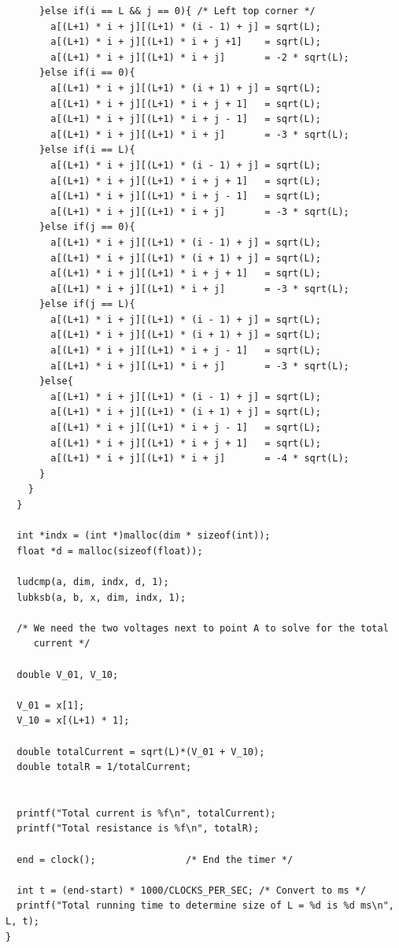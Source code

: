 \documentclass{article}
\begin{document}
\begin{verbatim}
      }else if(i == L && j == 0){ /* Left top corner */
        a[(L+1) * i + j][(L+1) * (i - 1) + j] = sqrt(L);
        a[(L+1) * i + j][(L+1) * i + j +1]    = sqrt(L);
        a[(L+1) * i + j][(L+1) * i + j]       = -2 * sqrt(L);
      }else if(i == 0){
        a[(L+1) * i + j][(L+1) * (i + 1) + j] = sqrt(L);
        a[(L+1) * i + j][(L+1) * i + j + 1]   = sqrt(L);
        a[(L+1) * i + j][(L+1) * i + j - 1]   = sqrt(L);
        a[(L+1) * i + j][(L+1) * i + j]       = -3 * sqrt(L);
      }else if(i == L){
        a[(L+1) * i + j][(L+1) * (i - 1) + j] = sqrt(L);
        a[(L+1) * i + j][(L+1) * i + j + 1]   = sqrt(L);
        a[(L+1) * i + j][(L+1) * i + j - 1]   = sqrt(L);
        a[(L+1) * i + j][(L+1) * i + j]       = -3 * sqrt(L);
      }else if(j == 0){
        a[(L+1) * i + j][(L+1) * (i - 1) + j] = sqrt(L);
        a[(L+1) * i + j][(L+1) * (i + 1) + j] = sqrt(L);
        a[(L+1) * i + j][(L+1) * i + j + 1]   = sqrt(L);
        a[(L+1) * i + j][(L+1) * i + j]       = -3 * sqrt(L);
      }else if(j == L){
        a[(L+1) * i + j][(L+1) * (i - 1) + j] = sqrt(L);
        a[(L+1) * i + j][(L+1) * (i + 1) + j] = sqrt(L);
        a[(L+1) * i + j][(L+1) * i + j - 1]   = sqrt(L);
        a[(L+1) * i + j][(L+1) * i + j]       = -3 * sqrt(L);
      }else{
        a[(L+1) * i + j][(L+1) * (i - 1) + j] = sqrt(L);
        a[(L+1) * i + j][(L+1) * (i + 1) + j] = sqrt(L);
        a[(L+1) * i + j][(L+1) * i + j - 1]   = sqrt(L);
        a[(L+1) * i + j][(L+1) * i + j + 1]   = sqrt(L);
        a[(L+1) * i + j][(L+1) * i + j]       = -4 * sqrt(L);
      }
    }
  }

  int *indx = (int *)malloc(dim * sizeof(int));
  float *d = malloc(sizeof(float));

  ludcmp(a, dim, indx, d, 1);
  lubksb(a, b, x, dim, indx, 1);

  /* We need the two voltages next to point A to solve for the total
     current */

  double V_01, V_10;

  V_01 = x[1];
  V_10 = x[(L+1) * 1];

  double totalCurrent = sqrt(L)*(V_01 + V_10);
  double totalR = 1/totalCurrent;


  printf("Total current is %f\n", totalCurrent);
  printf("Total resistance is %f\n", totalR);

  end = clock();                /* End the timer */

  int t = (end-start) * 1000/CLOCKS_PER_SEC; /* Convert to ms */
  printf("Total running time to determine size of L = %d is %d ms\n", L, t);
}
\end{verbatim}
\end{document}
